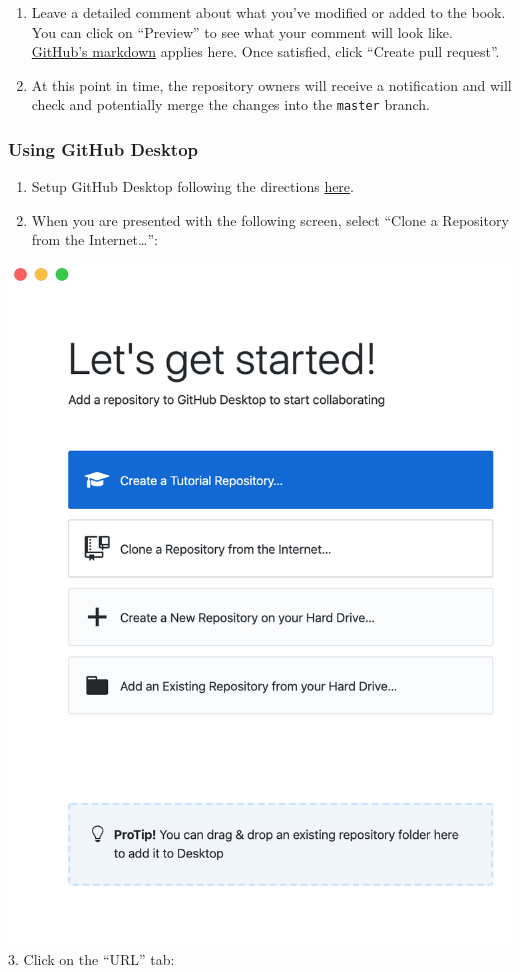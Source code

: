 \documentclass[]{book}
\providecommand{\tightlist}{%
  \setlength{\itemsep}{0pt}\setlength{\parskip}{0pt}}
\begin{document}
\begin{enumerate}
\def\labelenumi{\arabic{enumi}.}
\setcounter{enumi}{19}
\item
  Leave a detailed comment about what you've modified or added to the
  book. You can click on ``Preview'' to see what your comment will look
  like.
  \href{https://help.github.com/en/github/writing-on-github/basic-writing-and-formatting-syntax}{GitHub's
  markdown} applies here. Once satisfied, click ``Create pull request''.
\item
  At this point in time, the repository owners will receive a
  notification and will check and potentially merge the changes into the
  \texttt{master} branch.
\end{enumerate}

\subsubsection{Using GitHub Desktop}\label{using-github-desktop}

\begin{enumerate}
\def\labelenumi{\arabic{enumi}.}
\tightlist
\item
  Setup GitHub Desktop following the directions
  \protect\hyperlink{github-desktop-install}{here}.
\item
  When you are presented with the following screen, select ``Clone a
  Repository from the Internet\ldots{}'':
\end{enumerate}

\includegraphics{./images/gh-desktop-03.png} 3. Click on the ``URL''
tab:
\end{document}
